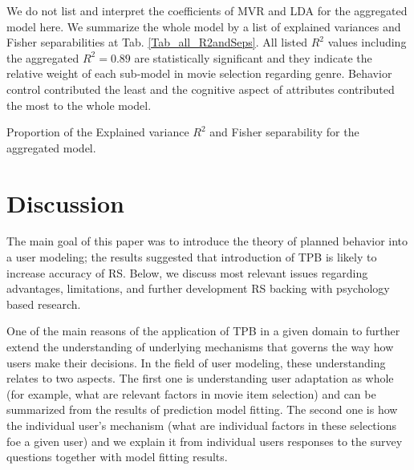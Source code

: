 \documentclass{llncs}
\begin{document}
%   


%   

We do not list and interpret the coefficients of MVR and LDA for the aggregated model here. We summarize the whole model by a list of explained variances and Fisher separabilities at Tab. \ref{Tab_all_R2andSeps}. All listed $R^2$ values including the aggregated $R^2=0.89$ are statistically significant and they indicate the relative weight of each sub-model in movie selection regarding genre. Behavior control contributed the least and the cognitive aspect of attributes contributed the most to the whole model. 

\begin{table}[!h]
  \centering
   
  \caption{Proportion of the Explained variance $R^2$ and Fisher separability for the aggregated model.}
  \label{Tab_all_R2andSeps}
\end{table}





 




\section{Discussion}\label{Sec_Disc}

The main goal of this paper was to introduce the theory of planned behavior into a user modeling;  the results suggested that introduction of TPB is likely to increase accuracy of RS. Below, we discuss most relevant issues regarding advantages, limitations, and further development RS backing with psychology based research. 

\vspace{0.6em}
 One of the main reasons of the application of TPB in a given domain to further extend the understanding of underlying mechanisms that governs the way how users make their decisions. In the field of user modeling, these understanding relates to two aspects. The first one is understanding user adaptation as whole (for example, what are relevant factors in movie item selection) and can be summarized from the results of prediction model fitting. The second one is how the individual user's mechanism (what are individual factors in these selections foe a given user) and we explain it from individual users responses to the survey questions together with model fitting results. 
\end{document}
